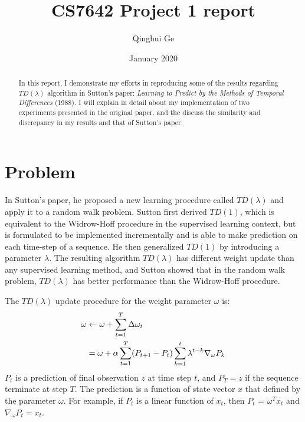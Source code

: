 \documentclass[conference]{IEEEtran}
\title{CS7642 Project 1 report}
\author{Qinghui Ge}
\date{January 2020}
\begin{document}
	
	\maketitle
	
	\begin{abstract}
		In this report, I demonstrate my efforts in reproducing some of the results regarding $TD(\lambda)$ algorithm in Sutton's paper: \textit{Learning to Predict by the Methods of Temporal Differences} (1988)\cite{sutton1988learning}. I will explain in detail about my implementation of two experiments presented in the original paper, and the discuss the similarity and discrepancy in my results and that of Sutton's paper.
	\end{abstract}
	
	\section{Problem}
	In Sutton's paper\cite{sutton1988learning}, he proposed a new learning procedure called $TD(\lambda)$ and apply it to a random walk problem. Sutton first derived $TD(1)$, which is equivalent to the Widrow-Hoff procedure in the supervised learning context, but is formulated to be implemented incrementally and is able to make prediction on each time-step of a sequence. He then generalized $TD(1)$ by introducing a parameter $\lambda$. The resulting algorithm $TD(\lambda)$ has different weight update than any supervised learning method, and Sutton showed that in the random walk problem, $TD(\lambda)$ has better performance than the Widrow-Hoff procedure.
	
	The $TD(\lambda)$ update procedure for the weight parameter $\omega$ is:
	\begin{align}
		\omega &\leftarrow \omega + \sum_{t=1}^{T} {\Delta \omega_t} \notag\\
		&= \omega + \alpha \sum_{t=1}^{T}(P_{t+1} - P_{t})\sum_{k=1}^{t} \lambda^{t-k}\nabla_\omega P_k
		\label{eq:tdlm}
	\end{align}
	$P_t$ is a prediction of final observation $z$ at time step $t$, and $P_{T} = z$ if the sequence terminate at step $T$. The prediction is a function of state vector $x$ that defined by the parameter $\omega$. For example, if $P_t$ is a linear function of $x_t$, then $P_t$ = $\omega^T x_t$ and $\nabla_\omega P_t = x_t$.
	
\end{document}
